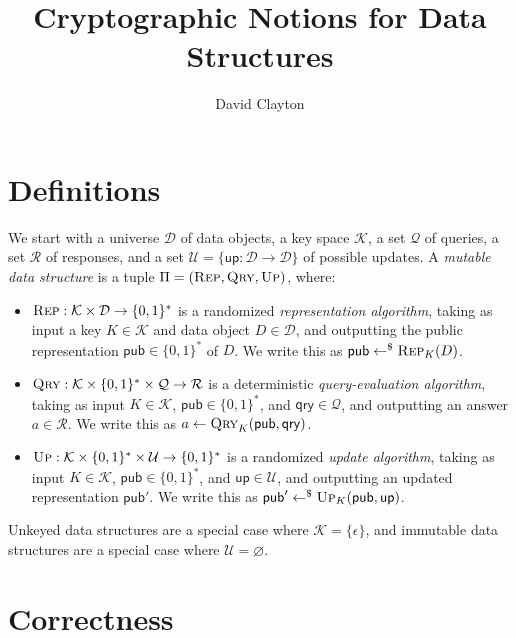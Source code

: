 \documentclass[11pt, pdftex]{article}
\title{Cryptographic Notions for Data Structures}
\author{David Clayton}
\begin{document}
\maketitle

\section{Definitions}

We start with a universe $\mathcal{D}$ of data objects, a key space $\mathcal{K}$, a set $\mathcal{Q}$ of queries, a set $\mathcal{R}$ of responses, and a set $\mathcal{U} = \{\mathsf{up}: \mathcal{D} \to \mathcal{D}\}$ of possible updates. A {\em mutable data structure} is a tuple $\Pi = (\textsc{Rep},\textsc{Qry},\textsc{Up})$, where:

\begin{itemize}
	\item $\textsc{Rep}: \mathcal{K} \times \mathcal{D} \to \{0,1\}^*$ is a randomized {\em representation algorithm}, taking as input a key $K \in \mathcal{K}$ and data object $D \in \mathcal{D}$, and outputting the public representation $\mathsf{pub} \in \{0,1\}^*$ of $D$. We write this as $\mathsf{pub} \gets^\$ \textsc{Rep}_K(D)$.
	\item $\textsc{Qry}: \mathcal{K} \times \{0,1\}^* \times \mathcal{Q} \to \mathcal{R}$ is a deterministic {\em query-evaluation algorithm}, taking as input $K \in \mathcal{K}$, $\mathsf{pub} \in \{0,1\}^*$, and $\mathsf{qry} \in \mathcal{Q}$, and outputting an answer $a \in \mathcal{R}$. We write this as $a \gets \textsc{Qry}_K(\mathsf{pub},\mathsf{qry})$.
	\item $\textsc{Up}: \mathcal{K} \times \{0,1\}^* \times \mathcal{U} \to \{0,1\}^*$ is a randomized {\em update algorithm}, taking as input $K \in \mathcal{K}$, $\mathsf{pub} \in \{0,1\}^*$, and $\mathsf{up} \in \mathcal{U}$, and outputting an updated representation $\mathsf{pub}'$. We write this as $\mathsf{pub}' \gets^\$ \textsc{Up}_K(\mathsf{pub},\mathsf{up})$.
\end{itemize}

Unkeyed data structures are a special case where $\mathcal{K} = \{\epsilon\}$, and immutable data structures are a special case where $\mathcal{U} = \varnothing$.

\section{Correctness}
\end{document}
